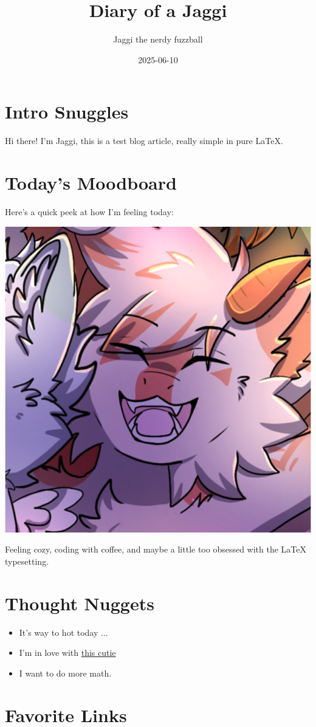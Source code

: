 \documentclass{article}
\title{Diary of a Jaggi}
\author{Jaggi the nerdy fuzzball}
\date{2025-06-10}
\begin{document}
\maketitle

\section*{Intro Snuggles}

Hi there! I’m Jaggi, this is a test blog article, really simple in pure \LaTeX.

\section*{Today's Moodboard}

Here’s a quick peek at how I’m feeling today:

\begin{center}
  \includegraphics[width=0.5\linewidth]{src/assets/happy_jaggi.png}
\end{center}

Feeling cozy, coding with coffee, and maybe a little too obsessed with the LaTeX typesetting.

\section*{Thought Nuggets}

\begin{itemize}
  \item It's way to hot today ...
  \item I'm in love with \href{https://github.com/Sigmanificient}{this cutie}
  \item I want to do more math.
\end{itemize}

\section*{Favorite Links}
\end{document}
